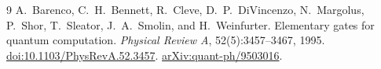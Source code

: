 \documentclass[11pt,a4paper]{article}
\begin{document}
\begin{thebibliography}{9}
A.~Barenco, C.~H.~Bennett, R.~Cleve, D.~P.~DiVincenzo,
N.~Margolus, P.~Shor, T.~Sleator, J.~A.~Smolin, and H.~Weinfurter.
\newblock Elementary gates for quantum computation.
\newblock \emph{Physical Review A}, 52(5):3457--3467, 1995.
\newblock \href{https://doi.org/10.1103/PhysRevA.52.3457}{doi:10.1103/PhysRevA.52.3457}.
\newblock \href{https://arxiv.org/abs/quant-ph/9503016}{arXiv:quant-ph/9503016}.
\end{thebibliography}
\end{document}

